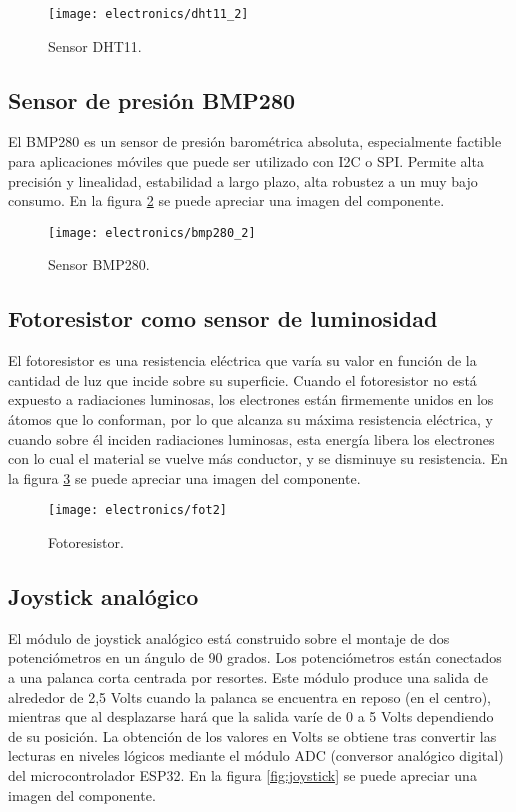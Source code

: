 \begin{figure}[h]
    \centering
    \texttt{[image: electronics/dht11\_2]}
    \caption{Sensor DHT11.}
    \label{fig:dht11}
\end{figure}

\subsection{Sensor de presión BMP280}

El BMP280 \cite{BMP280_datasheet} es un sensor de presión barométrica absoluta, especialmente factible para aplicaciones móviles que puede ser utilizado con I2C o SPI. Permite alta precisión y linealidad, estabilidad a largo plazo, alta robustez a un muy bajo consumo. En la figura \ref{fig:bmp280} se puede apreciar una imagen del componente.

\begin{figure}[h]
    \centering
    \texttt{[image: electronics/bmp280\_2]}
    \caption{Sensor BMP280.}
    \label{fig:bmp280}
\end{figure}

\subsection{Fotoresistor como sensor de luminosidad}

El fotoresistor es una resistencia eléctrica que varía su valor en función de la cantidad de luz que incide sobre su superficie. 
Cuando el fotoresistor no está expuesto a radiaciones luminosas, los electrones están firmemente unidos en los átomos que lo conforman, por lo que alcanza su máxima resistencia eléctrica, y cuando sobre él inciden radiaciones luminosas, esta energía libera los electrones con lo cual el material se vuelve más conductor, y se disminuye su resistencia. En la figura \ref{fig:fotoresistor} se puede apreciar una imagen del componente.

\begin{figure}[h]
    \centering
    \texttt{[image: electronics/fot2]}
    \caption{Fotoresistor.}
    \label{fig:fotoresistor}
\end{figure}


\subsection{Joystick analógico}
 
El módulo de joystick analógico \cite{analog_joystick_datasheet} está construido sobre el montaje de dos potenciómetros en un ángulo de 90 grados. Los potenciómetros están conectados a una palanca corta centrada por resortes. 
Este módulo produce una salida de alrededor de 2,5 Volts cuando la palanca se encuentra en reposo (en el centro), mientras que al desplazarse hará que la salida varíe de 0 a 5 Volts dependiendo de su posición. La obtención de los valores en Volts se obtiene tras convertir las lecturas en niveles lógicos mediante el módulo ADC (conversor analógico digital) \cite{ESP32_adc} del microcontrolador ESP32. En la figura \ref{fig:joystick} se puede apreciar una imagen del componente.

